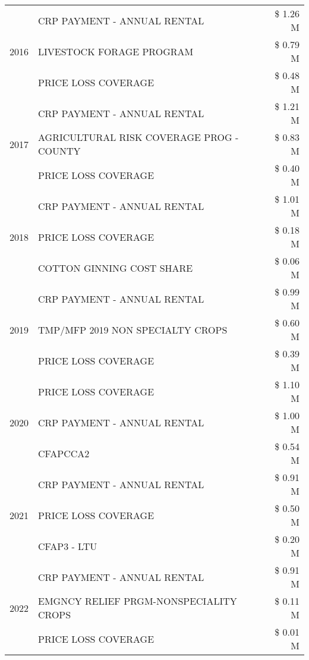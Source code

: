 \begin{tabular}{llr}
\cline{1-3}
\multirow[t]{3}{*}{2016} & CRP PAYMENT - ANNUAL RENTAL & \$ 1.26 M \\
 & LIVESTOCK FORAGE PROGRAM & \$ 0.79 M \\
 & PRICE LOSS COVERAGE & \$ 0.48 M \\
\cline{1-3}
\multirow[t]{3}{*}{2017} & CRP PAYMENT - ANNUAL RENTAL & \$ 1.21 M \\
 & AGRICULTURAL RISK COVERAGE PROG - COUNTY & \$ 0.83 M \\
 & PRICE LOSS COVERAGE & \$ 0.40 M \\
\cline{1-3}
\multirow[t]{3}{*}{2018} & CRP PAYMENT - ANNUAL RENTAL & \$ 1.01 M \\
 & PRICE LOSS COVERAGE & \$ 0.18 M \\
 & COTTON GINNING COST SHARE & \$ 0.06 M \\
\cline{1-3}
\multirow[t]{3}{*}{2019} & CRP PAYMENT - ANNUAL RENTAL & \$ 0.99 M \\
 & TMP/MFP 2019 NON SPECIALTY CROPS & \$ 0.60 M \\
 & PRICE LOSS COVERAGE & \$ 0.39 M \\
\cline{1-3}
\multirow[t]{3}{*}{2020} & PRICE LOSS COVERAGE & \$ 1.10 M \\
 & CRP PAYMENT - ANNUAL RENTAL & \$ 1.00 M \\
 & CFAPCCA2 & \$ 0.54 M \\
\cline{1-3}
\multirow[t]{3}{*}{2021} & CRP PAYMENT - ANNUAL RENTAL & \$ 0.91 M \\
 & PRICE LOSS COVERAGE & \$ 0.50 M \\
 & CFAP3 - LTU & \$ 0.20 M \\
\cline{1-3}
\multirow[t]{3}{*}{2022} & CRP PAYMENT - ANNUAL RENTAL & \$ 0.91 M \\
 & EMGNCY RELIEF PRGM-NONSPECIALITY CROPS & \$ 0.11 M \\
 & PRICE LOSS COVERAGE & \$ 0.01 M \\
\cline{1-3}
\bottomrule
\end{tabular}
